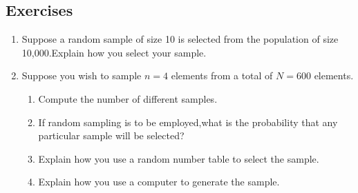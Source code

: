 

\subsection{Exercises}
\begin{enumerate}
\item Suppose a random sample of size 10 is selected from the population of size 10,000.Explain how you select your sample.

\item Suppose you wish to sample $n=4$ elements from a total of $N=600$ elements.

\begin{enumerate}
\item Compute the number of different samples.
\item If random sampling is to be employed,what is the probability that any particular sample will be selected?
\item Explain how you use a random number table to select the sample.
\item Explain how you use a computer to generate the sample.  
\end{enumerate}



\end{enumerate}



\iffalse
\begin{frame} \frametitle{Exercises}%

\noindent Exercises:

\bigskip

\noindent 11th edition, p. 151:  3.47-3.51

\bigskip

\noindent 10th edition, p. 166:  3.41-3.45

\end{frame}
\fi 